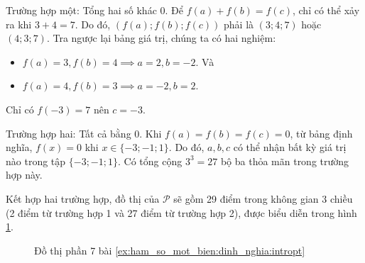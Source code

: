 \textcolor{colorEmphasis}{Trường hợp một}: Tổng hai số khác 0. Để $f(a) + f(b) = f(c)$, chỉ có thể xảy ra khi $3 + 4 = 7$. Do đó, $(f(a); f(b); f(c))$ phải là $(3; 4; 7)$ hoặc $(4; 3; 7)$. Tra ngược lại bảng giá trị, chúng ta có hai nghiệm:
   \begin{itemize}
      \item $f(a)=3, f(b)=4 \implies a=2, b=-2$. Và
      \item $f(a)=4, f(b)=3 \implies a=-2, b=2$.
   \end{itemize}

Chỉ có $f(-3) = 7$ nên $c = -3$.

\textcolor{colorEmphasisCyan}{Trường hợp hai}: Tất cả bằng 0. Khi $f(a) = f(b) = f(c) = 0$, từ bảng định nghĩa, $f(x)=0$ khi $x \in \{-3; -1; 1\}$. Do đó, $a, b, c$ có thể nhận bất kỳ giá trị nào trong tập $\{-3; -1; 1\}$. Có tổng cộng $3^3 = 27$ bộ ba thỏa mãn trong trường hợp này.

Kết hợp hai trường hợp, đồ thị của $\mathcal{P}$ sẽ gồm 29 điểm trong không gian 3 chiều (2 điểm từ trường hợp 1 và 27 điểm từ trường hợp 2), được biểu diễn trong hình \ref{fig:ham_so_mot_bien:dinh_nghia:dtp8}.

\begin{figure}[H]
   \centering
   \caption{Đồ thị phần 7 bài \ref{ex:ham_so_mot_bien:dinh_nghia:intropt}}
   \label{fig:ham_so_mot_bien:dinh_nghia:dtp8}
\end{figure}

